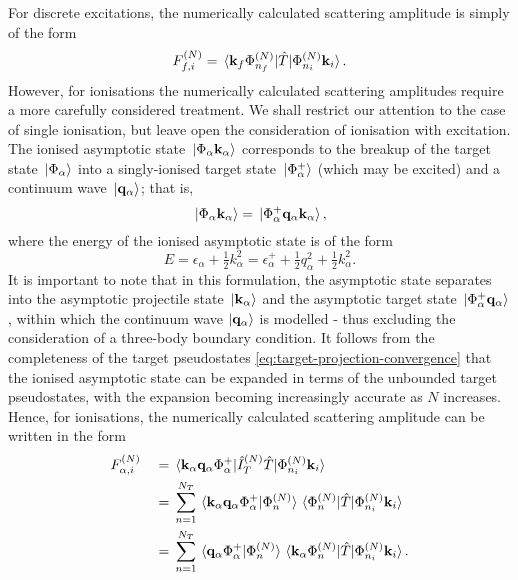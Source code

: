 \documentclass[draft]{article}
\begin{document}
For discrete excitations, the numerically calculated scattering amplitude is
simply of the form
\begin{equation}
  \label{eq:scattering-amplitude-discrete}
  F_{f, i}^{(N)}
  =
  \mel*
  {\vb{k}_{f} \Phi_{n_{f}}^{(N)}}
  {\hat{T}}
  {\Phi_{n_{i}}^{(N)} \vb{k}_{i}}
  .
\end{equation}
However, for ionisations the numerically calculated scattering amplitudes
require a more carefully considered treatment.
We shall restrict our attention to the case of single ionisation, but leave open
the consideration of ionisation with excitation.
The ionised asymptotic state $\ket*{\Phi_{\alpha} \vb{k}_{\alpha}}$ corresponds
to the breakup of the target state $\ket*{\Phi_{\alpha}}$ into a singly-ionised
target state $\ket*{\Phi_{\alpha}^{+}}$ (which may be excited) and a continuum
wave $\ket*{\vb{q}_{\alpha}}$; that is,
\begin{equation}
  \label{eq:asymptotic-ionised}
  \ket*{\Phi_{\alpha} \vb{k}_{\alpha}}
  =
  \ket*{\Phi_{\alpha}^{+} \vb{q}_{\alpha} \vb{k}_{\alpha}}
  ,
\end{equation}
where the energy of the ionised asymptotic state is of the form
\begin{equation}
  \label{eq:asymptotic-ionised-energy}
  E
  =
  \epsilon_{\alpha}
  +
  \tfrac{1}{2}
  k_{\alpha}^{2}
  =
  \epsilon_{\alpha}^{+}
  +
  \tfrac{1}{2}
  q_{\alpha}^{2}
  +
  \tfrac{1}{2}
  k_{\alpha}^{2}
  .
\end{equation}
It is important to note that in this formulation, the asymptotic state separates
into the asymptotic projectile state $\ket*{\vb{k}_{\alpha}}$ and the asymptotic
target state $\ket*{\Phi_{\alpha}^{+} \vb{q}_{\alpha}}$, within which the
continuum wave $\ket{\vb{q}_{\alpha}}$ is modelled - thus excluding the
consideration of a three-body boundary condition.
It follows from the completeness of the target pseudostates
\autoref{eq:target-projection-convergence} that the ionised asymptotic state can
be expanded in terms of the unbounded target pseudostates, with the expansion
becoming increasingly accurate as $N$ increases.
Hence, for ionisations, the numerically calculated scattering amplitude can be
written in the form
\begin{alignat}{2}
  \label{eq:scattering-amplitude-ionisation}
  &
  F_{\alpha, i}^{(N)}
  &
  {}={}
  &
  \mel*
  {\vb{k}_{\alpha} \vb{q}_{\alpha} \Phi_{\alpha}^{+}}
  {\hat{I}_{T}^{(N)} \hat{T}}
  {\Phi_{n_{i}}^{(N)} \vb{k}_{i}}
  \nonumber
  \\
  &
  &
  {}={}
  &
  \sum_{n = 1}^{N_{T}}
  \braket*
  {\vb{k}_{\alpha} \vb{q}_{\alpha} \Phi_{\alpha}^{+}}
  {\Phi_{n}^{(N)}}
  \mel*
  {\Phi_{n}^{(N)}}
  {\hat{T}}
  {\Phi_{n_{i}}^{(N)} \vb{k}_{i}}
  \nonumber
  \\
  &
  &
  {}={}
  &
  \sum_{n = 1}^{N_{T}}
  \braket*
  {\vb{q}_{\alpha} \Phi_{\alpha}^{+}}
  {\Phi_{n}^{(N)}}
  \mel*
  {\vb{k}_{\alpha} \Phi_{n}^{(N)}}
  {\hat{T}}
  {\Phi_{n_{i}}^{(N)} \vb{k}_{i}}
  .
\end{alignat}
\end{document}
